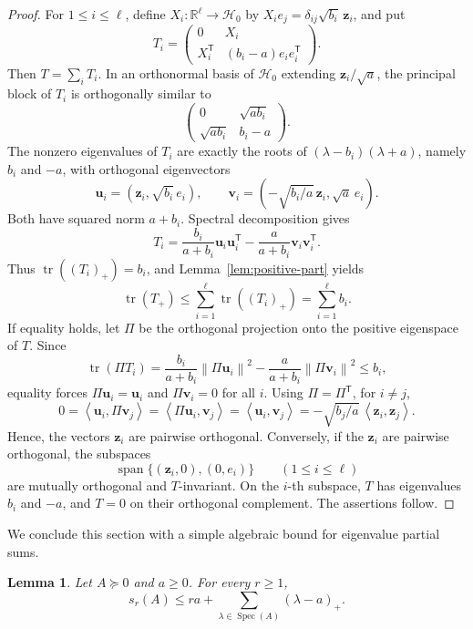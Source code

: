 \documentclass[11pt]{article}
\newtheorem{lemma}[theorem]{Lemma}
\newcommand{\R}{\mathbb{R}}
\newcommand{\tr}{\operatorname{tr}}
\newcommand{\Spec}{\operatorname{Spec}}
\newcommand{\Span}{\operatorname{span}}
\newcommand{\ip}[2]{\left\langle #1,#2\right\rangle}
\newcommand{\norm}[1]{\left\lVert #1\right\rVert}
\newcommand{\scrH}{\mathscr{H}}
\begin{document}
	\begin{proof}
		For \(1\le i\le\ell\), define \(X_i:\R^\ell\to\scrH_0\) by \(X_i e_j=\delta_{ij}\sqrt{b_i}\,\mathbf z_i\), and put
		\[
		T_i=
		\begin{pmatrix}
			0&X_i\\
			X_i^{\mathsf T}&(b_i-a)e_ie_i^{\mathsf T}
		\end{pmatrix}.
		\]
		Then \(T=\sum_iT_i\). In an orthonormal basis of \(\scrH_0\) extending \(\mathbf z_i/\sqrt{a}\), the principal block of \(T_i\) is orthogonally similar to
		\[
		\begin{pmatrix}
			0&\sqrt{ab_i}\\
			\sqrt{ab_i}&b_i-a
		\end{pmatrix}.
		\]
		The nonzero eigenvalues of \(T_i\) are exactly the roots of \((\lambda-b_i)(\lambda+a)\), namely \(b_i\) and \(-a\), with orthogonal eigenvectors
		\[
		\mathbf u_i=(\mathbf z_i,\sqrt{b_i}\,e_i),
		\qquad
		\mathbf v_i=(-\sqrt{b_i/a}\,\mathbf z_i,\sqrt a\,e_i).
		\]
		Both have squared norm \(a+b_i\). Spectral decomposition gives
		\[
		T_i=\frac{b_i}{a+b_i}\mathbf u_i\mathbf u_i^{\mathsf T}
		-\frac{a}{a+b_i}\mathbf v_i\mathbf v_i^{\mathsf T}.
		\]
		Thus \(\tr((T_i)_+)=b_i\), and Lemma~\ref{lem:positive-part} yields
		\[
		\tr(T_+)\le\sum_{i=1}^{\ell}\tr((T_i)_+)
		=\sum_{i=1}^{\ell}b_i.
		\]
		If equality holds, let \(\Pi\) be the orthogonal projection onto the positive eigenspace of \(T\). Since
		\[
		\tr(\Pi T_i)
		=\frac{b_i}{a+b_i}\norm{\Pi\mathbf u_i}^{2}
		-\frac{a}{a+b_i}\norm{\Pi\mathbf v_i}^{2}\le b_i,
		\]
		equality forces \(\Pi\mathbf u_i=\mathbf u_i\) and \(\Pi\mathbf v_i=0\) for all \(i\). Using \(\Pi=\Pi^{\mathsf T}\), for \(i\ne j\),
		\[
		0=\ip{\mathbf u_i}{\Pi\mathbf v_j}=\ip{\Pi\mathbf u_i}{\mathbf v_j}=\ip{\mathbf u_i}{\mathbf v_j}
		=-\sqrt{b_j/a}\,\ip{\mathbf z_i}{\mathbf z_j}.
		\]
		Hence, the vectors \(\mathbf z_i\) are pairwise orthogonal.
		Conversely, if the \(\mathbf z_i\) are pairwise orthogonal, the subspaces
		\[
			\Span\{(\mathbf z_i,0),(0,e_i)\}
			\qquad(1\le i\le\ell)
		\]
		are mutually orthogonal and \(T\)-invariant.  On the \(i\)-th subspace,
		\(T\) has eigenvalues \(b_i\) and \(-a\), and \(T=0\) on their
		orthogonal complement.  The assertions follow.
	\end{proof}



We conclude this section with a simple algebraic bound for eigenvalue partial sums.
	\begin{lemma}\label{lem:excess-controls}
		Let \(A\succeq0\) and \(a\ge0\). For every \(r\ge1\),
		\[
		s_r(A)\le ra+\sum_{\lambda\in\Spec(A)}(\lambda-a)_+.
		\]
	\end{lemma}
	
\end{document}
